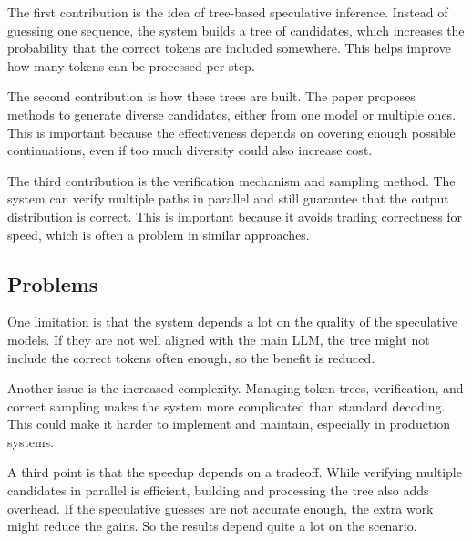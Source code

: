 \documentclass[a4paper, 12pt]{article}
\begin{document}
The first contribution is the idea of tree-based speculative inference. Instead of guessing one sequence, the system builds a tree of candidates, which increases the probability that the correct tokens are included somewhere. This helps improve how many tokens can be processed per step.

The second contribution is how these trees are built. The paper proposes methods to generate diverse candidates, either from one model or multiple ones. This is important because the effectiveness depends on covering enough possible continuations, even if too much diversity could also increase cost.

The third contribution is the verification mechanism and sampling method. The system can verify multiple paths in parallel and still guarantee that the output distribution is correct. This is important because it avoids trading correctness for speed, which is often a problem in similar approaches.

\subsection{Problems}

One limitation is that the system depends a lot on the quality of the speculative models. If they are not well aligned with the main LLM, the tree might not include the correct tokens often enough, so the benefit is reduced.

Another issue is the increased complexity. Managing token trees, verification, and correct sampling makes the system more complicated than standard decoding. This could make it harder to implement and maintain, especially in production systems.

A third point is that the speedup depends on a tradeoff. While verifying multiple candidates in parallel is efficient, building and processing the tree also adds overhead. If the speculative guesses are not accurate enough, the extra work might reduce the gains. So the results depend quite a lot on the scenario.
\end{document}
